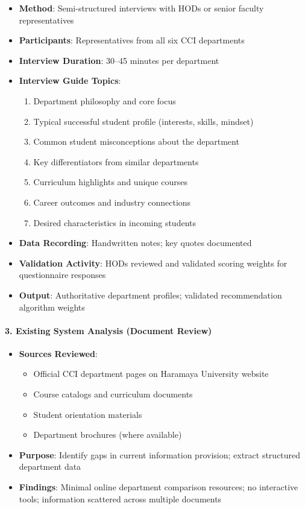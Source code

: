 \documentclass[12pt, a4paper]{article}
\begin{document}
\begin{itemize}[leftmargin=1.5em, itemsep=3pt]
    \item \textbf{Method}: Semi-structured interviews with HODs or senior faculty representatives
    \item \textbf{Participants}: Representatives from all six CCI departments
    \item \textbf{Interview Duration}: 30--45 minutes per department
    \item \textbf{Interview Guide Topics}:
    \begin{enumerate}[leftmargin=1.5em, itemsep=2pt]
        \item Department philosophy and core focus
        \item Typical successful student profile (interests, skills, mindset)
        \item Common student misconceptions about the department
        \item Key differentiators from similar departments
        \item Curriculum highlights and unique courses
        \item Career outcomes and industry connections
        \item Desired characteristics in incoming students
    \end{enumerate}
    \item \textbf{Data Recording}: Handwritten notes; key quotes documented
    \item \textbf{Validation Activity}: HODs reviewed and validated scoring weights for questionnaire responses
    \item \textbf{Output}: Authoritative department profiles; validated recommendation algorithm weights
\end{itemize}

\paragraph{3. Existing System Analysis (Document Review)}

\begin{itemize}[leftmargin=1.5em, itemsep=3pt]
    \item \textbf{Sources Reviewed}:
    \begin{itemize}[leftmargin=1.5em, itemsep=2pt]
        \item Official CCI department pages on Haramaya University website
        \item Course catalogs and curriculum documents
        \item Student orientation materials
        \item Department brochures (where available)
    \end{itemize}
    \item \textbf{Purpose}: Identify gaps in current information provision; extract structured department data
    \item \textbf{Findings}: Minimal online department comparison resources; no interactive tools; information scattered across multiple documents
\end{itemize}
\end{document}
